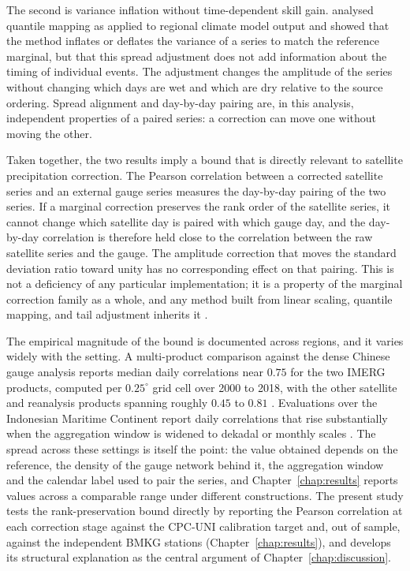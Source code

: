The second is variance inflation without time-dependent skill
gain. \citet{ref:maraun2013} analysed quantile mapping as
applied to regional climate model output and showed that the
method inflates or deflates the variance of a series to match
the reference marginal, but that this spread adjustment does not
add information about the timing of individual events. The
adjustment changes the amplitude of the series without changing
which days are wet and which are dry relative to the source
ordering. Spread alignment and day-by-day pairing are, in this
analysis, independent properties of a paired series: a
correction can move one without moving the other.

Taken together, the two results imply a bound that is directly
relevant to satellite precipitation correction. The Pearson
correlation between a corrected satellite series and an external
gauge series measures the day-by-day pairing of the two series.
If a marginal correction preserves the rank order of the
satellite series, it cannot change which satellite day is paired
with which gauge day, and the day-by-day correlation is therefore
held close to the correlation between the raw satellite series and
the gauge. The amplitude correction that moves the standard
deviation ratio toward unity has no corresponding effect on that
pairing. This is not a deficiency
of any particular implementation; it is a property of the
marginal correction family as a whole, and any method built from
linear scaling, quantile mapping, and tail adjustment inherits
it \citep{ref:maraun2013, ref:cannon2015}.

The empirical magnitude of the bound is documented across regions,
and it varies widely with the setting. A multi-product comparison
against the dense Chinese gauge analysis reports median daily
correlations near $0.75$ for the two IMERG products, computed per
$0.25^{\circ}$ grid cell over 2000 to 2018, with the other satellite
and reanalysis products spanning roughly $0.45$ to $0.81$
\citep[Fig.~3]{ref:tang2020}. Evaluations over the Indonesian
Maritime Continent report daily correlations that rise substantially
when the aggregation window is widened to dekadal or monthly scales
\citep{ref:ramadhan2022ts}. The spread across these settings is
itself the point: the value obtained depends on the reference, the
density of the gauge network behind it, the
aggregation window and the calendar label used to pair the series,
and Chapter~\ref{chap:results} reports values across a comparable
range under different constructions. The present study tests
the rank-preservation bound directly by reporting the Pearson
correlation at each correction stage against the CPC-UNI
calibration target and, out of sample, against the independent BMKG
stations (Chapter~\ref{chap:results}), and develops its structural
explanation as the central argument of
Chapter~\ref{chap:discussion}.


